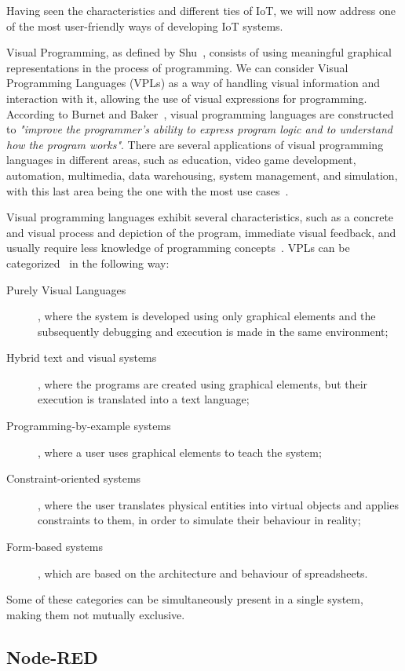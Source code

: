 Having seen the characteristics and different ties of IoT, we will now address one of the most user-friendly ways of developing IoT systems.

Visual Programming, as defined by Shu~\cite{vpl_definition_shu}, consists of using meaningful graphical representations in the process of programming. We can consider Visual Programming Languages (VPLs) as a way of handling visual information and interaction with it, allowing the use of visual expressions for programming. According to Burnet and Baker~\cite{scaling_vpls}, visual programming languages are constructed to \emph{ "improve the programmer's ability to express program logic and to understand how the program works"}. There are several applications of visual programming languages in different areas, such as education, video game development, automation, multimedia, data warehousing, system management, and simulation, with this last area being the one with the most use cases~\cite{survey_vpl_iot}.

Visual programming languages exhibit several characteristics, such as a concrete and visual process and depiction of the program, immediate visual feedback, and usually require less knowledge of programming concepts~\cite{scaling_vpls}. VPLs can be categorized~\cite{vpls_survey} in the following way: 
\begin{description}
    \item[Purely Visual Languages], where the system is developed using only graphical elements and the subsequently debugging and execution is made in the same environment;
    \item[Hybrid text and visual systems], where the programs are created using graphical elements, but their execution is translated into a text language;
    \item[Programming-by-example systems], where a user uses graphical elements to teach the system;
    \item[Constraint-oriented systems], where the user translates physical entities into virtual objects and applies constraints to them, in order to simulate their behaviour in reality;
    \item[Form-based systems], which are based on the architecture and behaviour of spreadsheets.
\end{description}

Some of these categories can be simultaneously present in a single system, making them not mutually exclusive.

\subsection{Node-RED}\label{sec:node-red}

